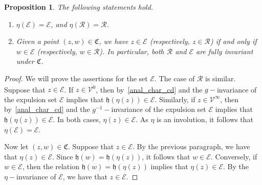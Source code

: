 \documentclass[11pt,a4paper, oneside]{amsart}
\newtheorem{prop}[thm]{Proposition}
\theoremstyle{definition}
\theoremstyle{remark}
\numberwithin{equation}{section}
\def\cV{\mathcal {V}}
\def\cE{\mathcal {E}}
\def\cR{\mathcal {R}}
\newcommand{\frakC}{\mathfrak{C}}
\begin{document}
\begin{prop}\label{invariance_prop}\upshape 
The following statements hold.

\begin{enumerate}
    \item $\eta(\pmb{\cE}) = \pmb{\cE}$, and $\eta(\pmb{\cR}) = \pmb{\cR}$.
    \item Given a point $(z, w) \in \mathfrak{C}$, we have $z\in \pmb{\cE}$ (respectively, $z\in \pmb{\cR}$) if and only if $w\in \pmb{\cE}$ (respectively, $w\in \pmb{\cR}$). In particular, both $\pmb{\cR}$ and $\pmb{\cE}$ are fully invariant under $\frakC$. 
\end{enumerate} 
\end{prop}
\begin{proof} 
We will prove the assertions for the set $\pmb{\cE}$. The case of $\pmb{\cR}$ is similar. Suppose that $z\in \pmb{\cE}$. If $z\in\overline{\cV^0}$, then by~\eqref{anal_char_cd} and the $g-$invariance of the expulsion set $\cE$ implies that $\mathfrak{h}(\eta(z))\in\cE$. Similarly, if $z\in\cV^\infty$, then by~\eqref{anal_char_cd} and the $g^{-1}-$invariance of the expulsion set $\cE$ implies that $\mathfrak{h}(\eta(z))\in\cE$. In both cases, $\eta(z)\in\pmb{\cE}$. As $\eta$ is an involution, it follows that $\eta(\pmb{\cE})=\pmb{\cE}$.

Now let $(z, w) \in \mathfrak{C}$. Suppose that $z\in\pmb{\cE}$. By the previous paragraph, we have that $\eta(z)\in\pmb{\cE}$. Since $\mathfrak{h}(w)=\mathfrak{h}(\eta(z))$, it follows that $w\in\pmb{\cE}$. Conversely, if $w\in\pmb{\cE}$, then the relation $\mathfrak{h}(w)=\mathfrak{h}(\eta(z))$ implies that $\eta(z)\in\pmb{\cE}$. By the $\eta-$invariance of $\pmb{\cE}$, we have that $z\in\pmb{\cE}$.
\end{proof}
\end{document}
